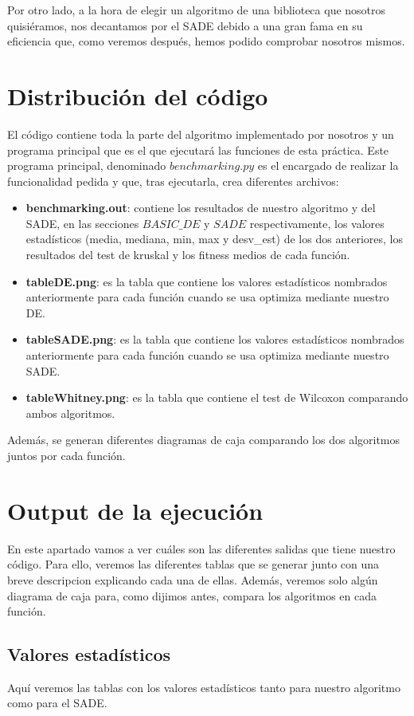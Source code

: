 \documentclass[11pt, a4paper, titlepage]{article}
\begin{document}
\vspace{5mm}

Por otro lado, a la hora de elegir un algoritmo de una biblioteca que nosotros quisiéramos, nos decantamos por el SADE debido a una gran fama en su eficiencia que, como veremos después, hemos podido comprobar nosotros mismos.

\section{Distribución del código}
El código contiene toda la parte del algoritmo implementado por nosotros y un programa principal que es el que ejecutará las funciones de esta práctica. Este programa principal, denominado $benchmarking.py$ es el encargado de realizar la funcionalidad pedida y que, tras ejecutarla, crea diferentes archivos:

\begin{itemize}
\item \textbf{benchmarking.out}: contiene los resultados de nuestro algoritmo y del SADE, en las secciones $BASIC\_DE$ y $SADE$ respectivamente, los valores estadísticos (media, mediana, min, max y desv\_est) de los dos anteriores, los resultados del test de kruskal y los fitness medios de cada función.
\item \textbf{tableDE.png}: es la tabla que contiene los valores estadísticos nombrados anteriormente para cada función cuando se usa optimiza mediante nuestro DE.
\item \textbf{tableSADE.png}: es la tabla que contiene los valores estadísticos nombrados anteriormente para cada función cuando se usa optimiza mediante nuestro SADE.
\item \textbf{tableWhitney.png}: es la tabla que contiene el test de Wilcoxon comparando ambos algoritmos.
\end{itemize}
Además, se generan diferentes diagramas de caja comparando los dos algoritmos juntos por cada función.

\section{Output de la ejecución}
En este apartado vamos a ver cuáles son las diferentes salidas que tiene nuestro código. Para ello, veremos las diferentes tablas que se generar junto con una breve descripcion explicando cada una de ellas. Además, veremos solo algún diagrama de caja para, como dijimos antes, compara los algoritmos en cada función.
\subsection{Valores estadísticos}
Aquí veremos las tablas con los valores estadísticos tanto para nuestro algoritmo como para el SADE.
\end{document}
